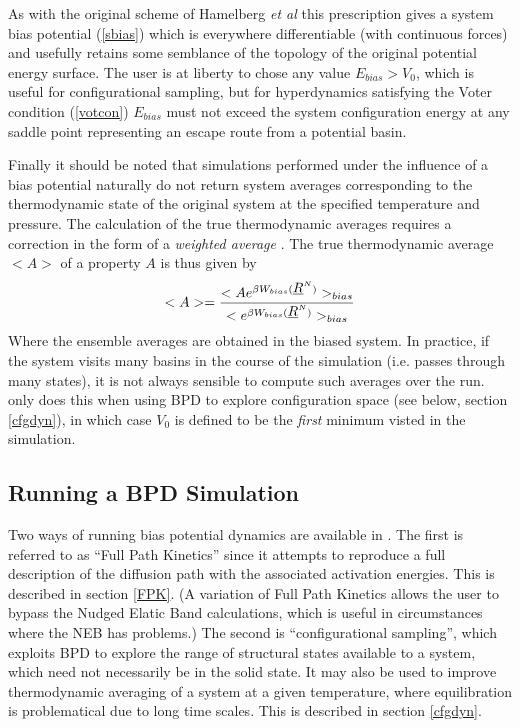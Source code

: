 As with the original scheme of Hamelberg {\em et al} \cite{hamelberg-04a} this
prescription gives a system bias potential (\ref{sbias}) which is everywhere
differentiable (with continuous forces) and usefully retains some semblance of
the topology of the original potential energy surface. The user is at liberty
to chose any value $E_{bias}>V_{0}$, which is useful for configurational
sampling, but for hyperdynamics satisfying the Voter condition (\ref{votcon})
$E_{bias}$ must not exceed the system configuration energy at any saddle point
representing an escape route from a potential basin.

Finally it should be noted that simulations performed under the
influence of a bias potential naturally do not return system averages
corresponding to the thermodynamic state of the original system
at the specified temperature and pressure. The calculation of the true
thermodynamic averages requires a correction in the form of a {\em
weighted average} \cite{hamelberg-04a}. The true thermodynamic average
$<A>$ of a property $A$ is thus given by
\begin{equation}
<A>=\frac{<Ae^{\beta W_{bias}(\mbox{$\underline{R}$}^{N})}>_{bias}}
{<e^{\beta W_{bias}(\mbox{$\underline{R}$}^{N})}>_{bias}} \label{cbias}
\end{equation}
Where the ensemble averages are obtained in the biased system.
In practice, if the system visits many basins in the course of the simulation
(i.e. passes through many states), it is not always sensible to compute such
averages over the run. \D{} only does this when using BPD to explore
configuration space (see below, section \ref{cfgdyn}), in which case $V_{0}$
is defined to be the {\em first} minimum visted in the simulation.

\subsection{Running a BPD Simulation}

Two ways of running bias potential dynamics are available in \D{}. The
first is referred to as ``Full Path Kinetics'' since it attempts to
reproduce a full description of the diffusion path with the associated
activation energies. This is described in section \ref{FPK}. (A variation of
Full Path Kinetics allows the user to bypass the Nudged Elatic Band
calculations, which is useful in circumstances where the NEB has problems.)
The second is ``configurational sampling'', which exploits BPD to explore
the range of structural states available to a system, which need not
necessarily be in the solid state. It may also be used to improve
thermodynamic averaging of a system at a given temperature, where
equilibration is problematical due to long time scales. This is
described in section \ref{cfgdyn}.

